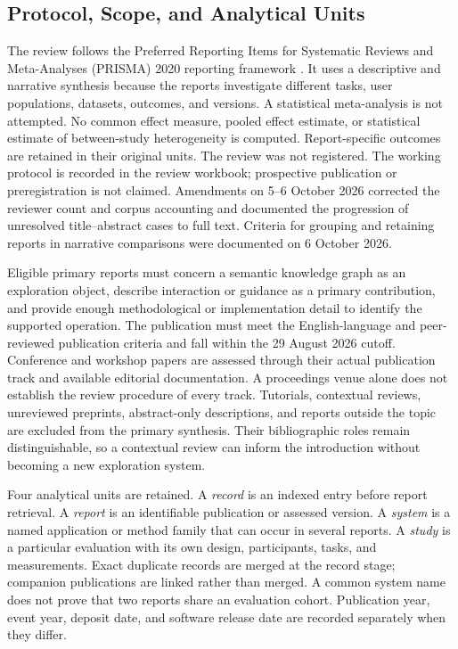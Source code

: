 \documentclass[manuscript,review,screen]{acmart}
\begin{document}
\subsection{Protocol, Scope, and Analytical Units}
The review follows the Preferred Reporting Items for Systematic Reviews and Meta-Analyses (PRISMA) 2020 reporting framework \citep{prisma2020}. It uses a descriptive and narrative synthesis because the reports investigate different tasks, user populations, datasets, outcomes, and versions. A statistical meta-analysis is not attempted. No common effect measure, pooled effect estimate, or statistical estimate of between-study heterogeneity is computed. Report-specific outcomes are retained in their original units. The review was not registered. The working protocol is recorded in the review workbook; prospective publication or preregistration is not claimed. Amendments on 5--6 October 2026 corrected the reviewer count and corpus accounting and documented the progression of unresolved title--abstract cases to full text. Criteria for grouping and retaining reports in narrative comparisons were documented on 6 October 2026.

Eligible primary reports must concern a semantic knowledge graph as an exploration object, describe interaction or guidance as a primary contribution, and provide enough methodological or implementation detail to identify the supported operation. The publication must meet the English-language and peer-reviewed publication criteria and fall within the 29 August 2026 cutoff. Conference and workshop papers are assessed through their actual publication track and available editorial documentation. A proceedings venue alone does not establish the review procedure of every track. Tutorials, contextual reviews, unreviewed preprints, abstract-only descriptions, and reports outside the topic are excluded from the primary synthesis. Their bibliographic roles remain distinguishable, so a contextual review can inform the introduction without becoming a new exploration system.

Four analytical units are retained. A \emph{record} is an indexed entry before report retrieval. A \emph{report} is an identifiable publication or assessed version. A \emph{system} is a named application or method family that can occur in several reports. A \emph{study} is a particular evaluation with its own design, participants, tasks, and measurements. Exact duplicate records are merged at the record stage; companion publications are linked rather than merged. A common system name does not prove that two reports share an evaluation cohort. Publication year, event year, deposit date, and software release date are recorded separately when they differ.
\end{document}

